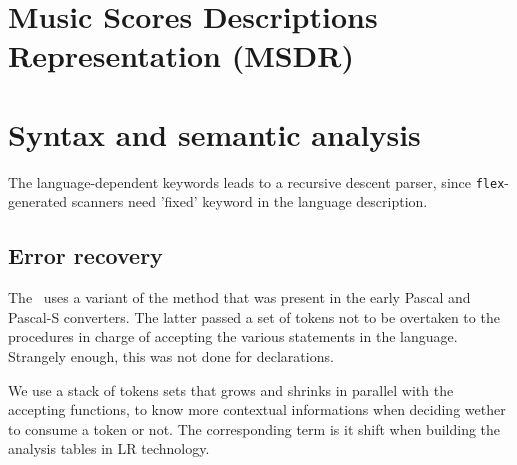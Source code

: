 \section{Music Scores Descriptions Representation (MSDR)}


\section{Syntax and semantic analysis}

The language-dependent keywords leads to a recursive descent parser, since {\tt flex}-generated scanners need 'fixed' keyword in the language description.


\subsection{Error recovery}

The \msdLangConv\ uses a variant of the  method that was present in the early Pascal and Pascal-S converters. The latter passed a set of tokens not to be overtaken to the procedures in charge of accepting the various statements in the language. Strangely enough, this was not done for declarations.

We use a stack of tokens sets that grows and shrinks in parallel with the accepting functions, to know more contextual informations when deciding wether to consume a token or not. The corresponding term is {it shift}
when building the analysis tables in LR technology.


